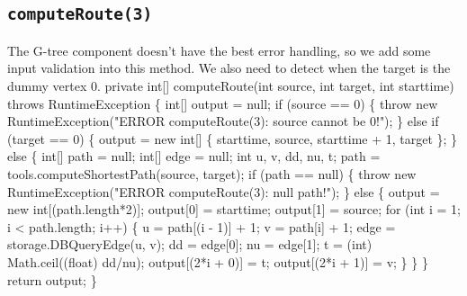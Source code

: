 \documentclass{article}
\def\nwendcode{\endtrivlist \endgroup}      %
\begin{document}
\subsection{{\tt{}\protect{}computeRoute(3)}}
The G-tree component doesn't have the best error handling, so we add some input
validation into this method.  We also need to detect when the target is the
dummy vertex 0.
\nwenddocs{}\plusendmoddef
private int[] computeRoute(int source, int target, int starttime)
throws RuntimeException \{
  int[] output = null;
  if (source == 0) \{
    throw new RuntimeException("ERROR computeRoute(3): source cannot be 0!");
  \} else if (target == 0) \{
    output = new int[] \{ starttime, source, starttime + 1, target \};
  \} else \{
    int[] path = null;
    int[] edge = null;
    int u, v, dd, nu, t;
    path = tools.computeShortestPath(source, target);
    if (path == null) \{
      throw new RuntimeException("ERROR computeRoute(3): null path!");
    \} else \{
      output = new int[(path.length*2)];
      output[0] = starttime;
      output[1] = source;
      for (int i = 1; i < path.length; i++) \{
        u = path[(i - 1)] + 1;
        v = path[i] + 1;
        edge = storage.DBQueryEdge(u, v);
        dd = edge[0];
        nu = edge[1];
        t = (int) Math.ceil((float) dd/nu);
        output[(2*i + 0)] = t;
        output[(2*i + 1)] = v;
      \}
    \}
  \}
  return output;
\}
\eatline
{}\nwendcode{}
\end{document}
